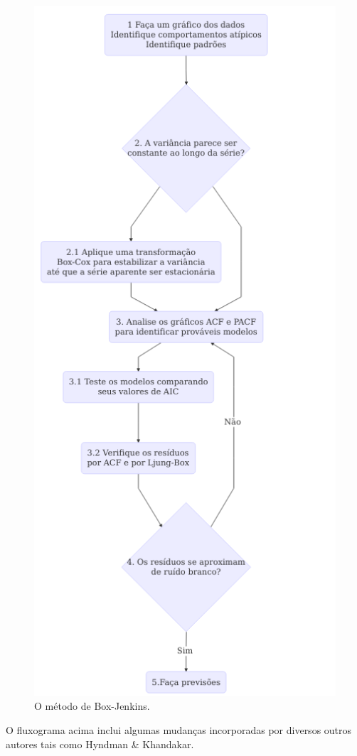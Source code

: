 \documentclass[
	12pt,				%
	openright,			%
	oneside,			%
	a4paper,			%
	english,			%
	french,				%
	spanish,			%
	brazil				%
	]{abntex2}
\begin{document}
\begin{figure}[h]
    \centering
	\includegraphics[scale=0.52]{boxjenkins}
	\caption{O método de Box-Jenkins.}
\end{figure}
\FloatBarrier

O fluxograma acima inclui algumas mudanças incorporadas por diversos outros autores tais como Hyndman \& Khandakar.
\end{document}

